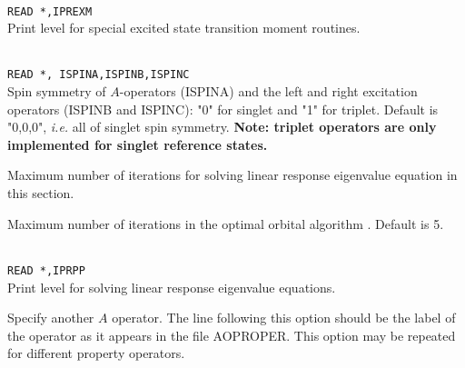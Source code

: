 \begin{description}
\item{}\\
\verb|READ *,IPREXM|\\
Print level for special excited state transition moment routines.

\item{}\\
\verb|READ *, ISPINA,ISPINB,ISPINC|\\
Spin symmetry of $A$-operators (ISPINA)
and the left and right excitation operators (ISPINB and ISPINC):
"0" for singlet and "1" for triplet.
Default is "0,0,0", {\it i.e.\/} all of singlet spin symmetry.
{\bf Note: triplet operators are only implemented for singlet reference states.}


\item{}
Maximum number of iterations for solving linear response
eigenvalue equation in this section.

\item{}
Maximum number of iterations in the optimal
orbital algorithm
\cite{tuhjahjajpjjcp84}.
Default is 5.

\item{}\\
\verb|READ *,IPRPP|\\
Print level for solving linear response eigenvalue equations.

\item[\Key{PROPRT}]
Specify another $A$ operator. The line following this
option should be the label of the operator as it appears in the file
AOPROPER. This option may be repeated for different property operators.


\end{description}
